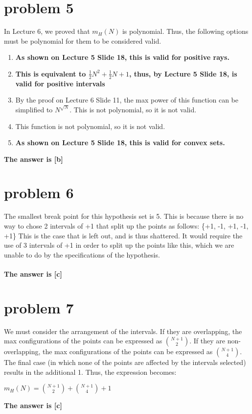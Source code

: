 \documentclass{article}
\begin{document}
\section*{problem 5}
In Lecture 6, we proved that $m_H(N)$ is polynomial. Thus, the following options must be polynomial for them to be considered valid.
\begin{enumerate}[label=(\roman*)]
    \item \textbf{As shown on Lecture 5 Slide 18, this is valid for positive rays.}
    \item \textbf{This is equivalent to $\frac{1}{2}N^2 + \frac{1}{2}N + 1$, thus, by Lecture 5 Slide 18, is valid for positive intervals}
    \item By the proof on Lecture 6 Slide 11, the max power of this function can be simplified to $N^{\sqrt{N}}$. This is not polynomial, so it is not valid.
    \item This function is not polynomial, so it is not valid.
    \item \textbf{As shown on Lecture 5 Slide 18, this is valid for convex sets.}
\end{enumerate}
\textbf{The answer is [b]}

\section*{problem 6}
The smallest break point for this hypothesis set is 5. This is because there is no way to chose 2 intervals of +1 that split up the points as follows: \{+1, -1, +1, -1, +1\} This is the case that is left out, and is thus shattered. It would require the use of 3 intervals of +1 in order to split up the points like this, which we are unable to do by the specifications of the hypothesis. \\ \\
\textbf{The answer is [c]}

\section*{problem 7}
We must consider the arrangement of the intervals. If they are overlapping, the max configurations of the points can be expressed as ${N+1 \choose 2}$. If they are non-overlapping, the max configurations of the points can be expressed as ${N+1 \choose 4}$. The final case (in which none of the points are affected by the intervals selected) results in the additional 1. Thus, the expression becomes: 
\begin{center}
    $m_H(N) = {N+1 \choose 2} + {N+1 \choose 4} + 1$
\end{center}
\textbf{The answer is [c]}
\end{document}
